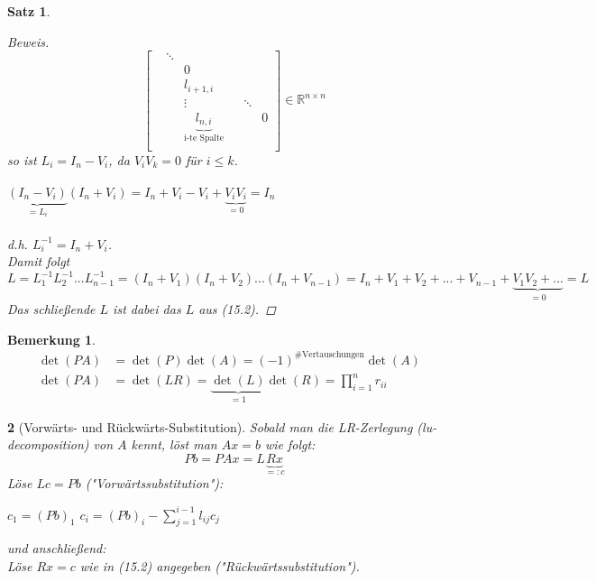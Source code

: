 \documentclass[12pt]{article}
\theoremstyle{break}
\newtheorem{theorem}{Satz}[subsection]
\newtheorem*{comment*}{Bemerkung}
\newtheorem{nothing}[theorem]{}
\begin{document}
\begin{theorem}
\begin{proof}[Beweis]
$$\begin{bmatrix}
& \ddots \\
&& 0 \\
&& l_{i+1,i} &  \\
&& \vdots &&\ddots&\\
&& \underbrace{l_{n,i}}_{\text{i-te Spalte}} &&&0 \\
\end{bmatrix}
\in \mathbb{R}^{n\times n}$$
so ist $L_i = I_n - V_i$, da $V_iV_k = 0$ für $i \leq k$.\\\\
$\underbrace{(I_n - V_i)}_{=L_i} (I_n + V_i) = I_n + V_i - V_i + \underbrace{V_iV_i}_{=0} = I_n$\\\\
d.h. $L_i^{-1} = I_n + V_i$.\\
Damit folgt $L = L_1^{-1}L_2^{-1} ... L_{n-1}^{-1} = (I_n + V_1)(I_n + V_2) ... (I_n + V_{n-1}) = I_n + V_1 + V_2 +... + V_{n-1} + \underbrace{V_1V_2 + ...}_{=0} = L$\\
Das schließende $L$ ist dabei das $L$ aus (15.2).
\end{proof}
\end{theorem}

\begin{comment*}
\begin{align*}
\det(PA) &= \det(P)\det(A) = (-1)^{\text{\# Vertauschungen}} \det(A) &\\
\det(PA) &= \det(LR) = \underbrace{\det(L)}_{=1} \det(R) = \prod_{i=1}^n r_{ii}
\end{align*}
\end{comment*}

\begin{nothing}[Vorwärts- und Rückwärts-Substitution]
Sobald man die LR-Zerlegung (lu-decomposition) von $A$ kennt, löst man $Ax = b$ wie folgt:
$$Pb = PAx = L\underbrace{Rx}_{=: c}$$
Löse $Lc = Pb$ ("Vorwärtssubstitution"):
%
\begin{algorithmic}
\STATE $c_1 = (Pb)_1$
\STATE $c_i = (Pb)_i - \sum_{j=1}^{i-1} l_{ij}c_j$
\ENDFOR
\end{algorithmic}
%
und anschließend:\\
Löse $Rx = c$ wie in (15.2) angegeben ("Rückwärtssubstitution").
\end{nothing}
\end{document}
